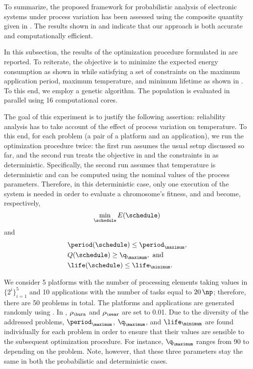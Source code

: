 To summarize, the proposed framework for probabilistic analysis of electronic
systems under process variation has been assessed using the composite quantity
given in . The results shown in
 and  indicate
that our approach is both accurate and computationally efficient.


In this subsection, the results of the optimization procedure formulated in
 are reported. To reiterate, the objective is to
minimize the expected energy consumption as shown in
 while satisfying a set of constraints on the
maximum application period, maximum temperature, and minimum lifetime as shown
in . To this end, we employ a genetic
algorithm. The population is evaluated in parallel using 16 computational cores.

The goal of this experiment is to justify the following assertion: reliability
analysis has to take account of the effect of process variation on temperature.
To this end, for each problem (a pair of a platform and an application), we run
the optimization procedure twice: the first run assumes the usual setup
discussed so far, and the second run treats the objective in
 and the constraints in
 as deterministic. Specifically, the second
run assumes that temperature is deterministic and can be computed using the
nominal values of the process parameters. Therefore, in this deterministic case,
only one execution of the system is needed in order to evaluate a chromosome's
fitness, and  and
 become, respectively,
\[
    \min_{\schedule} E(\schedule)
\]
and
\begin{align*}
  & \period(\schedule) \leq \period_\maximum, \\
  & Q(\schedule) \geq \q_\maximum, \text{ and} \\
  & \life(\schedule) \leq \life_\minimum.
\end{align*}

We consider 5 platforms with the number of processing elements \np taking values
in $\{ 2^i \}_{i = 1}^5$ and 10 applications with the number of tasks \nt equal
to $20 \, \np$; therefore, there are 50 problems in total. The platforms and
applications are generated randomly using  \cite{dick1998}. In
, $\rho_\burn$ and $\rho_\wear$ are set to
0.01. Due to the diversity of the addressed problems, $\period_\maximum$,
$\q_\maximum$, and $\life_\minimum$ are found individually for each problem in
order to ensure that their values are sensible to the subsequent optimization
procedure. For instance, $\q_\maximum$ ranges from 90 to  depending
on the problem. Note, however, that these three parameters stay the same in both
the probabilistic and deterministic cases.

